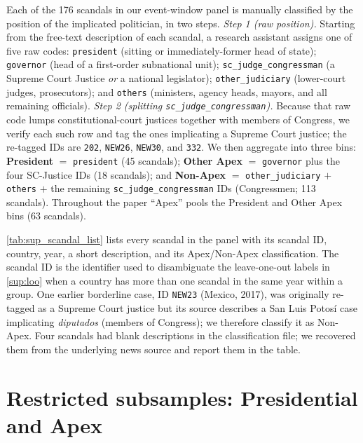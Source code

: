 \documentclass[11pt]{article}
\begin{document}
Each of the 176 scandals in our event-window panel is manually classified by the position of the implicated politician, in two steps. \emph{Step 1 (raw position).} Starting from the free-text description of each scandal, a research assistant assigns one of five raw codes: \texttt{president} (sitting or immediately-former head of state); \texttt{governor} (head of a first-order subnational unit); \texttt{sc\_judge\_congressman} (a Supreme Court Justice \emph{or} a national legislator); \texttt{other\_judiciary} (lower-court judges, prosecutors); and \texttt{others} (ministers, agency heads, mayors, and all remaining officials). \emph{Step 2 (splitting \texttt{sc\_judge\_congressman}).} Because that raw code lumps constitutional-court justices together with members of Congress, we verify each such row and tag the ones implicating a Supreme Court justice; the re-tagged IDs are \texttt{202}, \texttt{NEW26}, \texttt{NEW30}, and \texttt{332}. We then aggregate into three bins: \textbf{President} $=$ \texttt{president} (45 scandals); \textbf{Other Apex} $=$ \texttt{governor} plus the four SC-Justice IDs (18 scandals); and \textbf{Non-Apex} $=$ \texttt{other\_judiciary} $+$ \texttt{others} $+$ the remaining \texttt{sc\_judge\_congressman} IDs (Congressmen; 113 scandals). Throughout the paper ``Apex'' pools the President and Other Apex bins (63 scandals).

\autoref{tab:sup_scandal_list} lists every scandal in the panel with its scandal ID, country, year, a short description, and its Apex/Non-Apex classification. The scandal ID is the identifier used to disambiguate the leave-one-out labels in \autoref{sup:loo} when a country has more than one scandal in the same year within a group. One earlier borderline case, ID \texttt{NEW23} (Mexico, 2017), was originally re-tagged as a Supreme Court justice but its source describes a San Luis Potos\'i case implicating \emph{diputados} (members of Congress); we therefore classify it as Non-Apex. Four scandals had blank descriptions in the classification file; we recovered them from the underlying news source and report them in the table.

{}

\clearpage
\section{Restricted subsamples: Presidential and Apex}\label{sup:restricted}
\end{document}
